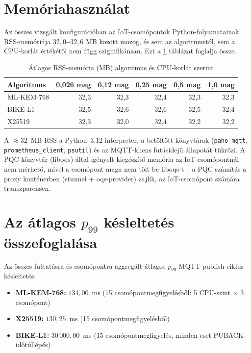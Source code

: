 \section{Memóriahasználat}

Az összes vizsgált konfigurációban az IoT-csomópontok Python-folyamatainak RSS-memóriája
\textbf{$32{,}0$--$32{,}6$} MB között mozog, és sem az algoritmustól, sem a CPU-korlát
értékétől nem függ szignifikánsan. Ezt a \ref{tab:memory} táblázat foglalja össze.

\begin{table}[ht]
\centering
\caption{Átlagos RSS-memória (MB) algoritmus és CPU-korlát szerint}
\label{tab:memory}
\begin{tabular}{lrrrrr}
\hline
\textbf{Algoritmus} & \textbf{0,026 mag} & \textbf{0,12 mag} & \textbf{0,25 mag} & \textbf{0,5 mag} & \textbf{1,0 mag} \\
\hline
ML-KEM-768 & 32,3 & 32,3 & 32,4 & 32,3 & 32,3 \\
BIKE-L1    & 32,5 & 32,6 & 32,6 & 32,5 & 32,4 \\
X25519     & 32,3 & 32,0 & 32,4 & 32,2 & 32,2 \\
\hline
\end{tabular}
\end{table}

A $\approx 32$~MB RSS a Python~3.12 interpreter, a betöltött könyvtárak (\texttt{paho-mqtt},
\texttt{prometheus\_client}, \texttt{psutil}) és az MQTT-kliens futásidejű állapotát tükrözi.
A PQC könyvtár (liboqs) által igényelt kiegészítő memória az IoT-csomópontnál nem mérhető,
mivel a csomópont maga nem tölt be liboqs-t -- a PQC számítás a proxy konténerben (stunnel
+ oqs-provider) zajlik, az IoT-csomópont számára transzparensen.

\section{Az átlagos $p_{99}$ késleltetés összefoglalása}

Az összes futtatásra és csomópontra aggregált átlagos $p_{99}$ MQTT publish-ciklus
késleltetés:

\begin{itemize}
    \item \textbf{ML-KEM-768:} $134{,}00$~ms (15 csomópontmegfigyelésből: 5 CPU-szint $\times$ 3 csomópont)
    \item \textbf{X25519:} $130{,}25$~ms (15 csomópontmegfigyelésből)
    \item \textbf{BIKE-L1:} $30\,000{,}00$~ms (15 csomópontmegfigyelés, minden eset PUBACK-időtúllépés)
\end{itemize}

